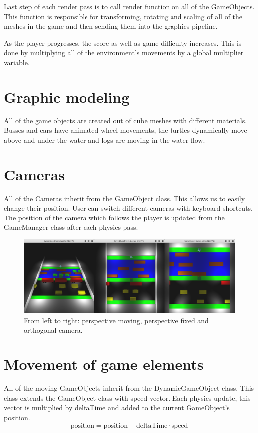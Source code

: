 \documentclass[a4paper,10pt]{article}
\begin{document}
Last step of each render pass is to call render function on all of the GameObjects. This function is responsible for transforming, rotating and scaling of all of the meshes in the game and then sending them into the graphics pipeline. 

As the player progresses, the score as well as game difficulty increases. This is done by multiplying all of the environment's movements by a global multiplier variable.

\section{Graphic modeling}
All of the game objects are created out of cube meshes with different materials. Busses and cars have animated wheel movements, the turtles dynamically move above and under the water and logs are moving in the water flow.

\section{Cameras}
All of the Cameras inherit from the GameObject class. This allows us to easily change their position. User can switch different cameras with keyboard shortcuts. The position of the camera which follows the player is updated from the GameManager class after each physics pass.

\begin{figure}[!htb]
	\centering
  	\includegraphics[width=\linewidth]{images/image6.png}
  	\caption{From left to right: perspective moving, perspective fixed and orthogonal camera.}
\end{figure}

\section{Movement of game elements}
All of the moving GameObjects inherit from the DynamicGameObject class. This class extends the GameObject class with speed vector. Each physics update, this vector is multiplied by deltaTime and added to the current GameObject's position. $$\text{position} = \text{position} + \text{deltaTime} \cdot \text{speed}$$
\end{document}
